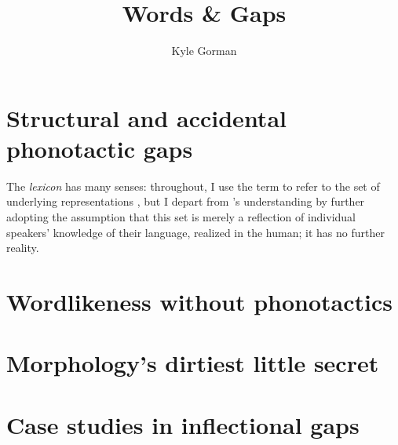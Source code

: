 \documentclass{upenndiss}
\title{Words \& Gaps}
\author{Kyle Gorman}
\begin{document}
\frenchspacing

\FrontMatter

\chapter{Structural and accidental phonotactic gaps}


The \emph{lexicon} has many senses: throughout, I use the term to refer to the set of underlying representations \citep[][269]{LANGUAGE}, but I depart from \citeauthor{LANGUAGE}'s understanding by further adopting the assumption that this set is merely a reflection of individual speakers' knowledge of their language, realized in the human; it has no further reality.

\chapter{Wordlikeness without phonotactics}



\chapter{Morphology's dirtiest little secret}


\chapter{Case studies in inflectional gaps}

\end{document}
